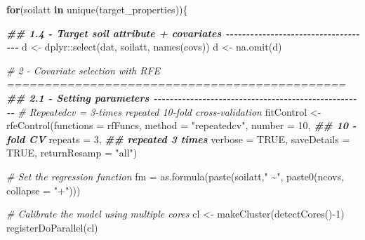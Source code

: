 \documentclass[
  10pt,
  b5paper,
  oneside]{book}
\newenvironment{Shaded}{\begin{snugshade}}{\end{snugshade}}
\newcommand{\AttributeTok}[1]{\textcolor[rgb]{0.77,0.63,0.00}{#1}}
\newcommand{\CommentTok}[1]{\textcolor[rgb]{0.56,0.35,0.01}{\textit{#1}}}
\newcommand{\ConstantTok}[1]{\textcolor[rgb]{0.00,0.00,0.00}{#1}}
\newcommand{\ControlFlowTok}[1]{\textcolor[rgb]{0.13,0.29,0.53}{\textbf{#1}}}
\newcommand{\DecValTok}[1]{\textcolor[rgb]{0.00,0.00,0.81}{#1}}
\newcommand{\DocumentationTok}[1]{\textcolor[rgb]{0.56,0.35,0.01}{\textbf{\textit{#1}}}}
\newcommand{\FunctionTok}[1]{\textcolor[rgb]{0.00,0.00,0.00}{#1}}
\newcommand{\NormalTok}[1]{#1}
\newcommand{\OtherTok}[1]{\textcolor[rgb]{0.56,0.35,0.01}{#1}}
\newcommand{\SpecialCharTok}[1]{\textcolor[rgb]{0.00,0.00,0.00}{#1}}
\newcommand{\StringTok}[1]{\textcolor[rgb]{0.31,0.60,0.02}{#1}}
\begin{document}
\begin{Shaded}
\begin{Highlighting}[]
\ControlFlowTok{for}\NormalTok{(soilatt }\ControlFlowTok{in} \FunctionTok{unique}\NormalTok{(target\_properties))\{}


\DocumentationTok{\#\# 1.4 {-} Target soil attribute + covariates {-}{-}{-}{-}{-}{-}{-}{-}{-}{-}{-}{-}{-}{-}{-}{-}{-}{-}{-}{-}{-}{-}{-}{-}{-}{-}{-}{-}{-}{-}{-}{-}{-}{-}{-}{-}}
\NormalTok{d }\OtherTok{\textless{}{-}}\NormalTok{ dplyr}\SpecialCharTok{::}\FunctionTok{select}\NormalTok{(dat, soilatt, }\FunctionTok{names}\NormalTok{(covs))}
\NormalTok{d }\OtherTok{\textless{}{-}} \FunctionTok{na.omit}\NormalTok{(d)}

\CommentTok{\# 2 {-} Covariate selection with RFE =============================================}
\DocumentationTok{\#\# 2.1 {-} Setting parameters {-}{-}{-}{-}{-}{-}{-}{-}{-}{-}{-}{-}{-}{-}{-}{-}{-}{-}{-}{-}{-}{-}{-}{-}{-}{-}{-}{-}{-}{-}{-}{-}{-}{-}{-}{-}{-}{-}{-}{-}{-}{-}{-}{-}{-}{-}{-}{-}{-}{-}{-}{-}}
\CommentTok{\# Repeatedcv = 3{-}times repeated 10{-}fold cross{-}validation}
\NormalTok{fitControl }\OtherTok{\textless{}{-}} \FunctionTok{rfeControl}\NormalTok{(}\AttributeTok{functions =}\NormalTok{ rfFuncs,}
                         \AttributeTok{method =} \StringTok{"repeatedcv"}\NormalTok{,}
                         \AttributeTok{number =} \DecValTok{10}\NormalTok{,         }\DocumentationTok{\#\# 10 {-}fold CV}
                         \AttributeTok{repeats =} \DecValTok{3}\NormalTok{,        }\DocumentationTok{\#\# repeated 3 times}
                         \AttributeTok{verbose =} \ConstantTok{TRUE}\NormalTok{,}
                         \AttributeTok{saveDetails =} \ConstantTok{TRUE}\NormalTok{, }
                         \AttributeTok{returnResamp =} \StringTok{"all"}\NormalTok{)}

\CommentTok{\# Set the regression function}
\NormalTok{fm }\OtherTok{=} \FunctionTok{as.formula}\NormalTok{(}\FunctionTok{paste}\NormalTok{(soilatt,}\StringTok{" \textasciitilde{}"}\NormalTok{, }\FunctionTok{paste0}\NormalTok{(ncovs,}
                                             \AttributeTok{collapse =} \StringTok{"+"}\NormalTok{)))}

\CommentTok{\# Calibrate the model using multiple cores}
\NormalTok{cl }\OtherTok{\textless{}{-}} \FunctionTok{makeCluster}\NormalTok{(}\FunctionTok{detectCores}\NormalTok{()}\SpecialCharTok{{-}}\DecValTok{1}\NormalTok{)}
\FunctionTok{registerDoParallel}\NormalTok{(cl)}
\end{Highlighting}
\end{Shaded}
\end{document}
